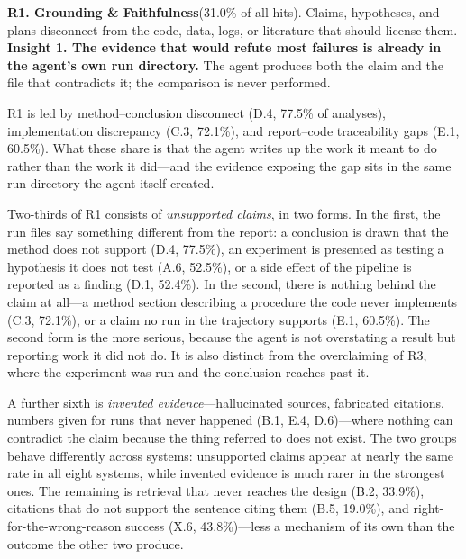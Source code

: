 \begin{tcolorbox}[colback=blue!3,colframe=blue!35,boxrule=0.5pt,
                  left=5pt,right=5pt,top=4pt,bottom=4pt]
\textbf{R1. Grounding \& Faithfulness}\;(31.0\% of all hits). Claims,
hypotheses, and plans disconnect from the code, data, logs, or literature
that should license them.\\[3pt]
\raisebox{-1pt}{\scriptsize$\blacktriangleright$}\;\textbf{Insight 1. The
evidence that would refute most failures is already in the agent's own run
directory.} The agent produces both the claim and the file that contradicts
it; the comparison is never performed.
\end{tcolorbox}

\noindent R1 is led by method--conclusion disconnect (D.4, 77.5\% of
analyses), implementation discrepancy (C.3, 72.1\%), and report--code
traceability gaps (E.1, 60.5\%). What these share is that the agent writes
up the work it meant to do rather than the work it did---and the evidence
exposing the gap sits in the same run directory the agent itself created.

Two-thirds of R1 consists of \emph{unsupported claims}, in two forms. In the
first, the run files say something different from the report: a conclusion is
drawn that the method does not support (D.4, 77.5\%), an experiment is
presented as testing a hypothesis it does not test (A.6, 52.5\%), or a side
effect of the pipeline is reported as a finding (D.1, 52.4\%). In the second,
there is nothing behind the claim at all---a method section describing a
procedure the code never implements (C.3, 72.1\%), or a claim no run in the
trajectory supports (E.1, 60.5\%). The second form is the more serious,
because the agent is not overstating a result but reporting work it did not
do. It is also distinct from the overclaiming of R3, where the experiment was
run and the conclusion reaches past it.

A further sixth is \emph{invented evidence}---hallucinated sources, fabricated
citations, numbers given for runs that never happened (B.1, E.4,
D.6)---where nothing can contradict the claim because the thing referred to
does not exist. The two groups behave differently across systems: unsupported
claims appear at nearly the same rate in all eight systems, while invented
evidence is much rarer in the strongest ones. The remaining is retrieval that
never reaches the design (B.2, 33.9\%), citations that do not support the
sentence citing them (B.5, 19.0\%), and right-for-the-wrong-reason success
(X.6, 43.8\%)---less a mechanism of its own than the outcome the other two
produce.

